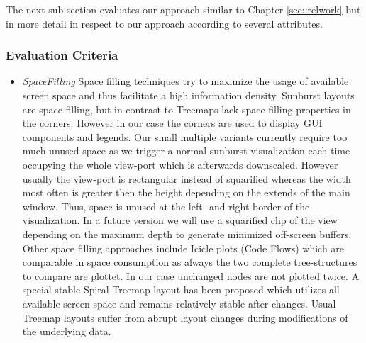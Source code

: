 The next sub-section evaluates our approach similar to Chapter \ref{sec::relwork} but in more detail in respect to our approach according to several attributes.

\subsubsection{Evaluation Criteria}

\begin{itemize}
\item \emph{SpaceFilling} Space filling techniques try to maximize the usage of available screen space and thus facilitate a high information density. Sunburst layouts are space filling, but in contrast to Treemaps lack space filling properties in the corners. However in our case the corners are used to display GUI components and legends. Our small multiple variants currently require too much unused space as we trigger a normal sunburst visualization each time occupying the whole view-port which is afterwards downscaled. However usually the view-port is rectangular instead of squarified whereas the width most often is greater then the height depending on the extends of the main window. Thus, space is unused at the left- and right-border of the visualization. In a future version we will use a squarified clip of the view depending on the maximum depth to generate minimized off-screen buffers. Other space filling approaches include Icicle plots (Code Flows) which are comparable in space consumption as always the two complete tree-structures to compare are plottet. In our case unchanged nodes are not plotted twice. A special stable Spiral-Treemap layout has been proposed which utilizes all available screen space and remains relatively stable after changes. Usual Treemap layouts suffer from abrupt layout changes during modifications of the underlying data.

\end{itemize}
